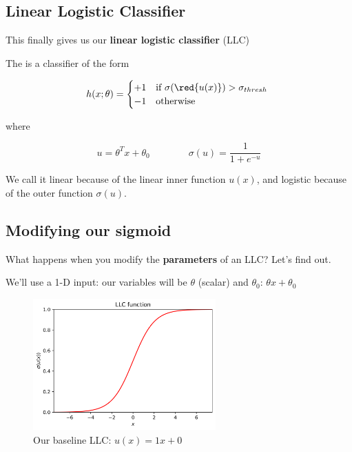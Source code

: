     \subsection{Linear Logistic Classifier}
        
        This finally gives us our \textbf{linear logistic classifier} (LLC)\\
        
        \begin{kequation}
            The  is a  classifier of the form
            
            \begin{equation*}
                h(x; \theta) = 
                \begin{cases}
                    +1 & \text{if $\sigma(\red{u(x)})>\sigma_{thresh}$ }\\
                    -1 & \text{otherwise}
                \end{cases}
            \end{equation*}
            
            where 
            
            \begin{equation}
                u=\theta^T x + \theta_0   \qquad\qquad \sigma(u) = \frac{1}{1+e^{-u}}
            \end{equation}
            
            We call it linear because of the linear inner function $u(x)$, and logistic because of the outer function $\sigma(u)$.
        \end{kequation}
        
    \subsection{Modifying our sigmoid}
    
        What happens when you modify the \textbf{parameters} of an LLC? Let's find out.
        
        We'll use a 1-D input: our variables will be $\theta$ (scalar) and $\theta_0$: $\theta x + \theta_0$
        
        \begin{figure}[H]
            \centering
            \includegraphics[width=70mm,scale=0.5]{images/classification_images/llc_func.png}
            \caption*{Our baseline LLC: $u(x)=1x+0 $}
        \end{figure}
        
